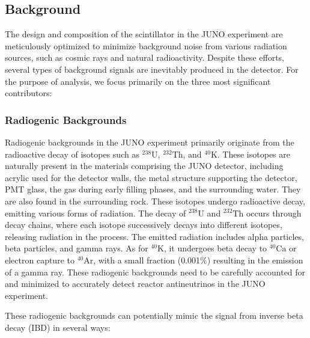 \newpage 

\subsection{Background}
The design and composition of the scintillator in the JUNO experiment are meticulously optimized to minimize background noise from various radiation sources, such as cosmic rays and natural radioactivity. Despite these efforts, several types of background signals are inevitably produced in the detector. For the purpose of analysis, we focus primarily on the three most significant contributors:


\subsubsection*{Radiogenic Backgrounds}


Radiogenic backgrounds in the JUNO experiment primarily originate from the radioactive decay of isotopes such as $^{238}\mathrm{U}$, $^{232}\mathrm{Th}$, and $^{40}\mathrm{K}$. These isotopes are naturally present in the materials comprising the JUNO detector, including acrylic used for the detector walls, the metal structure supporting the detector, PMT glass, the gas during early filling phases, and the surrounding water. They are also found in the surrounding rock. These isotopes undergo radioactive decay, emitting various forms of radiation. The decay of $^{238}\mathrm{U}$ and $^{232}\mathrm{Th}$ occurs through decay chains, where each isotope successively decays into different isotopes, releasing radiation in the process. The emitted radiation includes alpha particles, beta particles, and gamma rays. As for $^{40}\mathrm{K}$, it undergoes beta decay to $^{40}\mathrm{Ca}$ or electron capture to $^{40}\mathrm{Ar}$, with a small fraction (0.001$\%$) resulting in the emission of a gamma ray. These radiogenic backgrounds need to be carefully accounted for and minimized to accurately detect reactor antineutrinos in the JUNO experiment.


These radiogenic backgrounds can potentially mimic the signal from inverse beta decay (IBD) in several ways:

